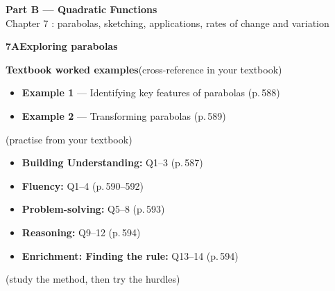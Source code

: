 \documentclass[11pt]{article}
\newcommand{\partband}[2]{\clearpage
  \begin{tcolorbox}[enhanced,colback=chalkdk,colframe=chalkdk,boxrule=0pt,left=14pt,right=14pt,top=12pt,bottom=12pt,arc=4pt]
   {\color{white}\Large\bfseries\textsf{#1}}\\[2pt]{\color{white}\textsf{#2}}\end{tcolorbox}\vspace{4pt}}
\newcommand{\sectionband}[3]{\needspace{5\baselineskip}\vspace{6pt}
  \begin{tcolorbox}[enhanced,colback=chalk,colframe=chalk,boxrule=0pt,left=12pt,right=12pt,top=8pt,bottom=8pt,arc=4pt,
      overlay={\node[anchor=east,text=white,opacity=0.9] at ([xshift=-12pt]frame.east) {\small\textsf{#3}};}]
    {\color{white}\large\bfseries\textsf{#1}\quad #2}\end{tcolorbox}}
\begin{document}
\partband{Part B --- Quadratic Functions}{Chapter 7 : parabolas, sketching, applications, rates of change and variation}

\sectionband{7A}{Exploring parabolas}{CORE}

\begin{refbox}
{\bfseries\color{chalkdk}Textbook worked examples}\;\textcolor{inksoft}{\small(cross-reference in your textbook)}\\[3pt]
\begin{itemize}[leftmargin=16pt,itemsep=1pt,topsep=2pt]
  \item \textbf{Example 1} --- Identifying key features of parabolas \textcolor{inksoft}{(p.\,588)}
  \item \textbf{Example 2} --- Transforming parabolas \textcolor{inksoft}{(p.\,589)}
\end{itemize}
\;\textcolor{inksoft}{\small(practise from your textbook)}\\[3pt]
\begin{itemize}[leftmargin=16pt,itemsep=1pt,topsep=2pt]
  \item \textbf{Building Understanding:} Q1--3 \textcolor{inksoft}{(p.\,587)}
  \item \textbf{Fluency:} Q1--4 \textcolor{inksoft}{(p.\,590--592)}
  \item \textbf{Problem-solving:} Q5--8 \textcolor{inksoft}{(p.\,593)}
  \item \textbf{Reasoning:} Q9--12 \textcolor{inksoft}{(p.\,594)}
  \item \textbf{Enrichment: Finding the rule:} Q13--14 \textcolor{inksoft}{(p.\,594)}
\end{itemize}\end{refbox}

\;\textcolor{inksoft}{\small(study the method, then try the hurdles)}\par
\end{document}
